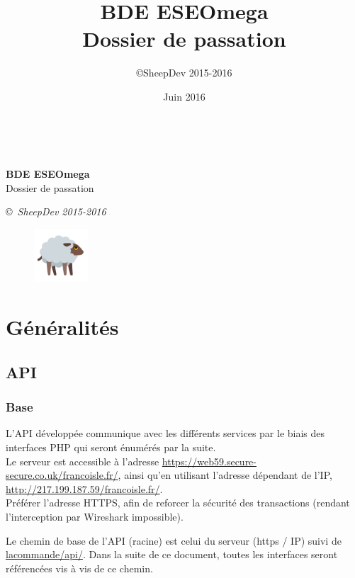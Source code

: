 \documentclass[12pt,a4paper,oneside]{report}
\author{\copyright SheepDev 2015-2016}
\title{BDE ESEOmega\\Dossier de passation}
\date{Juin 2016}
\begin{document}
\begin{center}

~

\vfill
\vfill
\huge{\textbf{BDE ESEOmega}\\Dossier de passation}

\Large{\copyright ~\textsl{SheepDev 2015-2016}}

\vfill

\end{center}

\begin{figure}[h!]\centering
\includegraphics[width=2cm]{res/sheep.png}
\label{fig:results}
\end{figure}

\vfill
\vfill
\vfill

\newpage

\chapter{Généralités}

\section{API}

\subsection{Base}

L'API développée communique avec les différents services par le biais des interfaces PHP qui seront énumérés par la suite.\\

\noindent Le serveur est accessible à l'adresse \url{https://web59.secure-secure.co.uk/francoisle.fr/}, ainsi qu'en utilisant l'adresse dépendant de l'IP, \url{http://217.199.187.59/francoisle.fr/}. \\

\noindent Préférer l'adresse HTTPS, afin de reforcer la sécurité des transactions (rendant l'interception par Wireshark impossible).

\noindent Le chemin de base de l'API (racine) est celui du serveur (https / IP) suivi de \url{lacommande/api/}. Dans la suite de ce document, toutes les interfaces seront référencées vis à vis de ce chemin.
\end{document}
